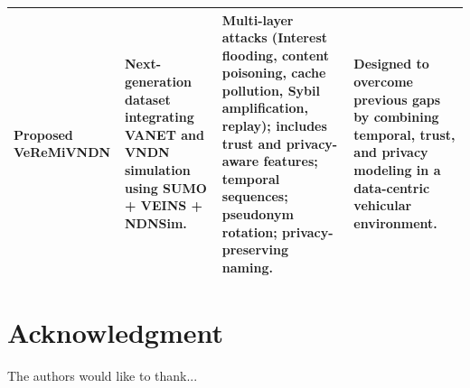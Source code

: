 \documentclass[journal,comsoc]{IEEEtran}
\begin{document}
\begin{table}[!t]
\begin{tabular}{|p{2.2cm}|p{4.3cm}|p{5.2cm}|p{4.3cm}|}
\textbf{Proposed VeReMiVNDN} &
Next-generation dataset integrating VANET and VNDN simulation using SUMO + VEINS + NDNSim. &
Multi-layer attacks (Interest flooding, content poisoning, cache pollution, Sybil amplification, replay); includes trust and privacy-aware features; temporal sequences; pseudonym rotation; privacy-preserving naming. &
Designed to overcome previous gaps by combining temporal, trust, and privacy modeling in a data-centric vehicular environment. \\ \hline
\end{tabular}
\end{table}



\section*{Acknowledgment}


The authors would like to thank...


\ifCLASSOPTIONcaptionsoff
  \newpage
\fi







%

\end{document}
